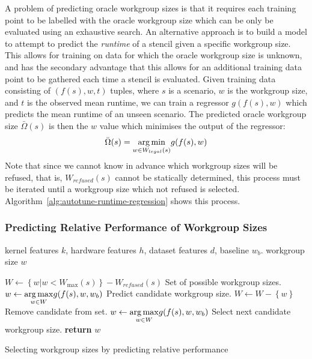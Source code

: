 \documentclass[nonatbib,preprint,11pt]{sigplanconf}
\begin{document}
A problem of predicting oracle workgroup sizes is that it requires
each training point to be labelled with the oracle workgroup size
which can be only be evaluated using an exhaustive search. An
alternative approach is to build a model to attempt to predict the
\emph{runtime} of a stencil given a specific workgroup size. This
allows for training on data for which the oracle workgroup size is
unknown, and has the secondary advantage that this allows for an
additional training data point to be gathered each time a stencil is
evaluated. Given training data consisting of $(f(s),w,t)$ tuples,
where $s$ is a scenario, $w$ is the workgroup size, and $t$ is the
observed mean runtime, we can train a regressor $g(f(s), w)$ which
predicts the mean runtime of an unseen scenario. The predicted oracle
workgroup size $\bar{\Omega}(s)$ is then the $w$ value which minimises
the output of the regressor:
%
\begin{equation}
  \bar{\Omega}(s) = \underset{w \in W_{legal}(s)}{\operatorname*{arg\,min}} g(f(s), w)
\end{equation}
%
Note that since we cannot know in advance which workgroup sizes will
be refused, that is, $W_{refused}(s)$ cannot be statically determined,
this process must be iterated until a workgroup size which not refused
is selected. Algorithm~\ref{alg:autotune-runtime-regression} shows
this process.


\subsubsection{Predicting Relative Performance of Workgroup Sizes}

\begin{algorithm}
\begin{algorithmic}[1]
\Require kernel features $k$, hardware features $h$, dataset features
$d$, baseline $w_b$.
\Ensure workgroup size $w$

\State $W \leftarrow \left\{ w | w < W_{\max}(s) \right\} - W_{refused}(s)$
\Comment Set of possible workgroup sizes.
\State $w \leftarrow \underset{w \in W}{\operatorname*{arg\,max}} g(f(s), w,w_b)$
\Comment Predict candidate workgroup size.
  \State $W \leftarrow W - \left\{ w \right\}$
  \Comment Remove candidate from set.
  \State $w \leftarrow \underset{w \in W}{\operatorname*{arg\,max}} g(f(s), w,w_b)$
  \Comment Select next candidate workgroup size.
\EndWhile
\State \textbf{return} $w$
\end{algorithmic}
\caption{Selecting workgroup sizes by predicting relative performance}
\label{alg:autotune-speedup-regression}
\end{algorithm}
\end{document}
